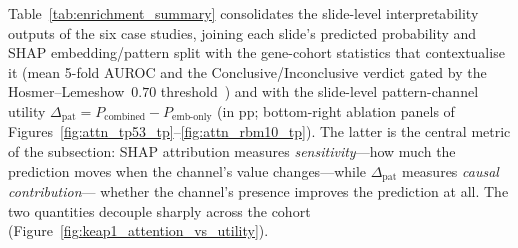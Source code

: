 Table~\ref{tab:enrichment_summary} consolidates the slide-level
interpretability outputs of the six case studies, joining each
slide's predicted probability and SHAP embedding/pattern split
with the gene-cohort statistics that contextualise it (mean
5-fold AUROC and the Conclusive/Inconclusive verdict gated by
the Hosmer--Lemeshow~$0.70$ threshold~\cite{hosmer2000applied})
and with the slide-level pattern-channel utility
$\Delta_{\mathrm{pat}} = P_{\mathrm{combined}} -
P_{\mathrm{emb\text{-}only}}$ (in pp; bottom-right ablation
panels of
Figures~\ref{fig:attn_tp53_tp}--\ref{fig:attn_rbm10_tp}).
The latter is the central metric of the subsection: SHAP
attribution measures \emph{sensitivity}---how much the
prediction moves when the channel's value changes---while
$\Delta_{\mathrm{pat}}$ measures \emph{causal contribution}---%
whether the channel's presence improves the prediction at all.
The two quantities decouple sharply across the cohort
(Figure~\ref{fig:keap1_attention_vs_utility}).

